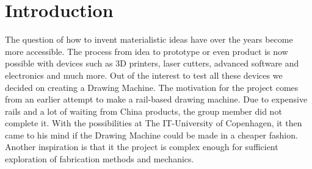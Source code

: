 
\section{Introduction}
The question of how to invent materialistic ideas have over the years become more accessible. The process from idea to prototype or even product is now possible with devices such as 3D printers, laser cutters, advanced software and electronics and much more. Out of the interest to test all these devices we decided on creating a Drawing Machine. The motivation for the project comes from an earlier attempt to make a rail-based drawing machine. Due to expensive rails and a lot of waiting from China products, the group member did not complete it. With the possibilities at The IT-University of Copenhagen, it then came to his mind if the Drawing Machine could be made in a cheaper fashion. Another inspiration is that it the project is complex enough for sufficient exploration of fabrication methods and mechanics.

